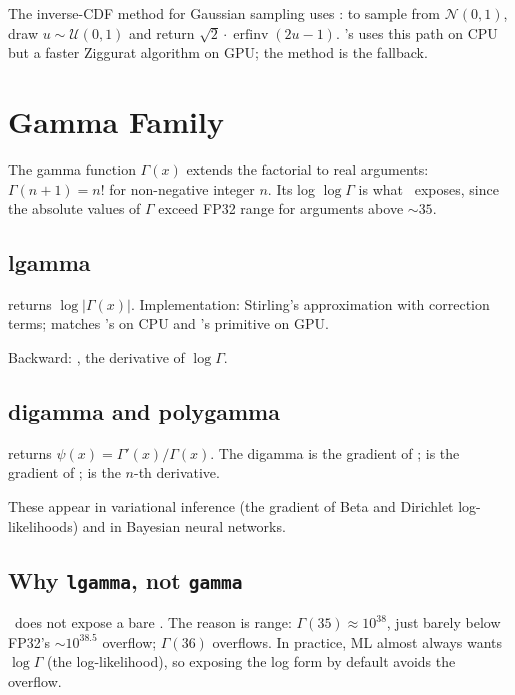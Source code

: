 The inverse-CDF method for Gaussian sampling uses :
to sample from $\mathcal{N}(0, 1)$, draw $u \sim
\mathcal{U}(0, 1)$ and return $\sqrt{2} \cdot
\operatorname{erfinv}(2u - 1)$. \Lucid's  uses
this path on CPU but a faster Ziggurat algorithm on GPU; the
 method is the fallback.

\section{Gamma Family}
\label{sec:special_functions:gamma}

The gamma function $\Gamma(x)$ extends the factorial to real
arguments: $\Gamma(n + 1) = n!$ for non-negative integer $n$.
Its log $\log \Gamma$ is what \Lucid\ exposes, since the
absolute values of $\Gamma$ exceed FP32 range for arguments above
$\sim 35$.

\subsection{lgamma}
\label{ssec:special_functions:lgamma}

 returns $\log |\Gamma(x)|$. Implementation:
Stirling's approximation with correction terms; matches
's  on CPU and \MLX's primitive
on GPU.

Backward: , the derivative of $\log \Gamma$.

\subsection{digamma and polygamma}
\label{ssec:special_functions:digamma}

 returns $\psi(x) = \Gamma'(x) / \Gamma(x)$.
The digamma is the gradient of ;  is
the gradient of ;  is the
$n$-th derivative.

These appear in variational inference (the gradient of
Beta and Dirichlet log-likelihoods) and in Bayesian neural
networks.

\subsection{Why \texttt{lgamma}, not \texttt{gamma}}
\label{ssec:special_functions:why_lgamma}

\Lucid\ does not expose a bare . The reason is range:
$\Gamma(35) \approx 10^{38}$, just barely below FP32's
$\sim 10^{38.5}$ overflow; $\Gamma(36)$ overflows. In practice,
ML almost always wants $\log \Gamma$ (the log-likelihood), so
exposing the log form by default avoids the overflow.

